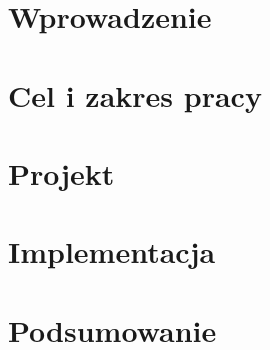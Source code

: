 
\chapter{Wprowadzenie}


\chapter{Cel i zakres pracy}


% 

% 

% 

% 

% 

\chapter{Projekt}


\chapter{Implementacja}


\chapter{Podsumowanie}
